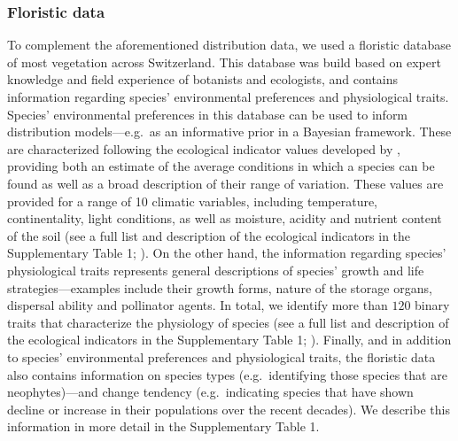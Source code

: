 \documentclass[11pt, a4paper]{article}
\begin{document}
\subsubsection*{Floristic data}
To complement the aforementioned distribution data, we used a floristic database of most vegetation across Switzerland. This database was build based on expert knowledge and field experience of botanists and ecologists, and contains information regarding species' environmental preferences and physiological traits. Species' environmental preferences in this database can be used to inform distribution models---e.g.~as an informative prior in a Bayesian framework. These are characterized following the ecological indicator values developed by \citet{landoltFloraIndicativaOkologische2010}, providing both an estimate of the average conditions in which a species can be found as well as a broad description of their range of variation. These values are provided for a range of 10 climatic variables, including temperature, continentality, light conditions, as well as moisture, acidity and nutrient content of the soil (see a full list and description of the ecological indicators in the Supplementary Table 1; \citealt{landoltFloraIndicativaOkologische2010}). On the other hand, the information regarding species' physiological traits represents general descriptions of species' growth and life strategies---examples include their growth forms, nature of the storage organs, dispersal ability and pollinator agents. In total, we identify more than $120$ binary traits that characterize the physiology of species (see a full list and description of the ecological indicators in the Supplementary Table 1; \citealt{landoltFloraIndicativaOkologische2010}). Finally, and in addition to species' environmental preferences and physiological traits, the floristic data also contains information on species types (e.g.~identifying those species that are neophytes)---and change tendency (e.g.~indicating species that have shown decline or increase in their populations over the recent decades). We describe this information in more detail in the Supplementary Table 1.


\end{document}
